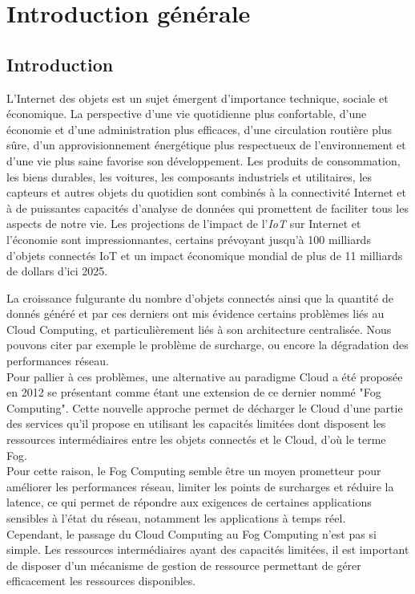 \chapter{Introduction générale}
\thispagestyle{fancy}
\section{Introduction}
\par L'Internet des objets est un sujet émergent d'importance technique, sociale et économique. La perspective d’une vie quotidienne plus confortable, d’une économie et d’une administration plus efficaces, d'une circulation routière plus sûre, d’un approvisionnement énergétique plus respectueux de l'environnement et d’une vie plus saine favorise son développement. Les produits de consommation, les biens durables, les voitures, les composants industriels et utilitaires, les capteurs et autres objets du quotidien sont combinés à la connectivité Internet et à de puissantes capacités d'analyse de données qui promettent de faciliter tous les aspects de notre vie. Les projections de l'impact de l'\emph{IoT} sur Internet et l'économie sont impressionnantes, certains prévoyant jusqu'à 100 milliards d'objets connectés IoT et un impact économique mondial de plus de 11 milliards de dollars d'ici 2025. \par
La croissance fulgurante du nombre d'objets connectés ainsi que la quantité de donnés généré et par ces derniers ont mis évidence certains problèmes liés au Cloud Computing, et particulièrement liés à son architecture centralisée. Nous pouvons citer par exemple le problème de surcharge, ou encore la dégradation des performances réseau.\\
Pour pallier à ces problèmes, une alternative au paradigme Cloud a été proposée en 2012 se présentant comme étant une extension de ce dernier nommé "Fog Computing". Cette nouvelle approche permet de décharger le Cloud d'une partie des services qu'il propose en utilisant les capacités limitées dont disposent les ressources intermédiaires entre les objets connectés et le Cloud, d'où le terme Fog.\\ 
Pour cette raison, le Fog Computing semble être un moyen prometteur pour améliorer les performances réseau, limiter les points de surcharges et réduire la latence, ce qui permet de répondre aux exigences de certaines applications sensibles à l'état du réseau, notamment les applications à temps réel.\\
Cependant, le passage du Cloud Computing au Fog Computing n’est pas si simple. Les ressources
intermédiaires ayant des capacités limitées, il est important de disposer d'un mécanisme de gestion de ressource permettant de gérer efficacement les ressources disponibles.
